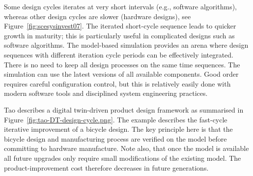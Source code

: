 Some  design cycles iterates at very short intervals (e.g., software algorithms), whereas other design cycles are slower (hardware designs), see Figure~\ref{fig:scesysinvest07}. The iterated short-cycle sequence leads to quicker growth in maturity; this is particularly useful in complicated designs such as software algorithms.
The model-based simulation provides an arena where design sequences with different iteration cycle periods can be effectively integrated. There is no need to keep all design processes on the same time sequences. The simulation can use the latest versions of all available components. Good order requires careful configuration control, but this is relatively easily done with modern software tools and disciplined system engineering practices.


Tao \cite{Tao2018-1443229} describes a digital twin-driven product design framework as summarised in Figure~\ref{fig:tao-DT-design-cycle.png}.  The example describes the fast-cycle iterative improvement of a bicycle design.  The key principle here is that the bicycle design and manufacturing process are verified on the model before committing to hardware manufacture.  Note also, that once the model is available all future upgrades only require small modifications of the existing model.  The product-improvement cost therefore decreases in future generations. 

